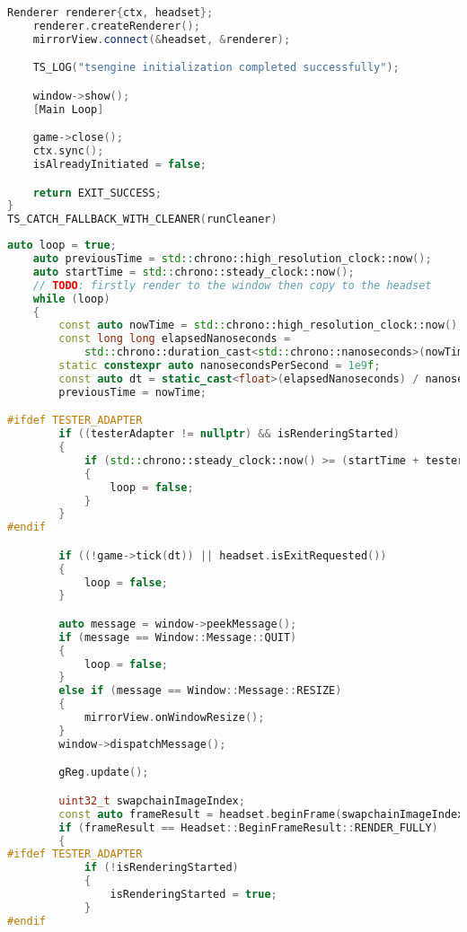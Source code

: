 \begin{lstlisting}[language=c++, caption=Engine's run function (./engine/src/core/core.cpp)]
    Renderer renderer{ctx, headset};
    renderer.createRenderer();
    mirrorView.connect(&headset, &renderer);

    TS_LOG("tsengine initialization completed successfully");

    window->show();
    [Main Loop]

    game->close();
    ctx.sync();
    isAlreadyInitiated = false;

    return EXIT_SUCCESS;
}
TS_CATCH_FALLBACK_WITH_CLEANER(runCleaner)
\end{lstlisting}

\begin{lstlisting}[language=c++, caption=Engine's main loop (./engine/src/core/core.cpp)]
    auto loop = true;
    auto previousTime = std::chrono::high_resolution_clock::now();
    auto startTime = std::chrono::steady_clock::now();
    // TODO: firstly render to the window then copy to the headset
    while (loop)
    {
        const auto nowTime = std::chrono::high_resolution_clock::now();
        const long long elapsedNanoseconds =
            std::chrono::duration_cast<std::chrono::nanoseconds>(nowTime - previousTime).count();
        static constexpr auto nanosecondsPerSecond = 1e9f;
        const auto dt = static_cast<float>(elapsedNanoseconds) / nanosecondsPerSecond;
        previousTime = nowTime;

#ifdef TESTER_ADAPTER 
        if ((testerAdapter != nullptr) && isRenderingStarted)
        {
            if (std::chrono::steady_clock::now() >= (startTime + testerAdapter->renderingDuration))
            {
                loop = false;
            }
        }
#endif

        if ((!game->tick(dt)) || headset.isExitRequested())
        {
            loop = false;
        }

        auto message = window->peekMessage();
        if (message == Window::Message::QUIT)
        {
            loop = false;
        }
        else if (message == Window::Message::RESIZE)
        {
            mirrorView.onWindowResize();
        }
        window->dispatchMessage();

        gReg.update();

        uint32_t swapchainImageIndex;
        const auto frameResult = headset.beginFrame(swapchainImageIndex);
        if (frameResult == Headset::BeginFrameResult::RENDER_FULLY)
        {
#ifdef TESTER_ADAPTER
            if (!isRenderingStarted)
            {
                isRenderingStarted = true;
            }
#endif


\end{lstlisting}
